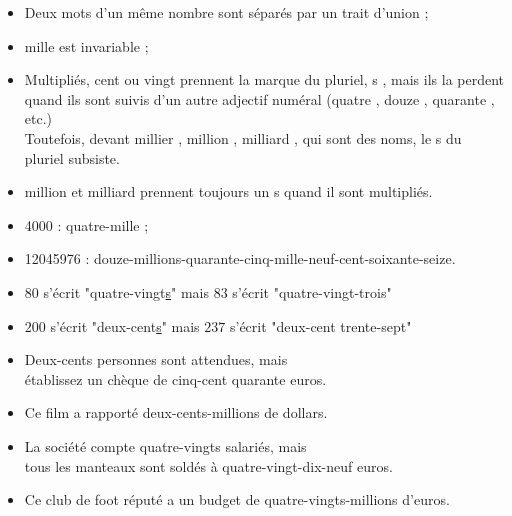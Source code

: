 \begin{propriete}   
   \begin{itemize}
      \item Deux mots d'un même nombre sont séparés par un trait d'union ;
      \item \og mille \fg est invariable ;
      \item Multipliés, \og cent \fg ou \og vingt \fg prennent la marque du pluriel, \og s \fg, mais ils la perdent quand ils sont suivis d’un autre adjectif numéral (\og quatre \fg, \og douze \fg, \og quarante \fg, etc.)\\
      Toutefois, devant \og millier \fg, \og million \fg, \og milliard \fg, qui sont des noms, le \og s \fg du pluriel subsiste.
      \item \og million \fg et \og milliard \fg prennent toujours un \og s \fg{} quand il sont multipliés.
   \end{itemize}
\end{propriete}

\begin{exemple*1}
   \begin{itemize}
        \item \num{4000} : quatre-mille ;        
        \item \num{12045976} : douze-millions-quarante-cinq-mille-neuf-cent-soixante-seize.
        \item $80$ s'écrit "quatre-vingt\underline{s}" mais $83$ s'écrit "quatre-vingt-trois"
        \item $200$ s'écrit "deux-cent\underline{s}" mais $237$ s'écrit "deux-cent trente-sept"
        \item Deux-cents personnes sont attendues, mais \\
        établissez un chèque de cinq-cent quarante euros.
        \item Ce film a rapporté deux-cents-millions de dollars.
        \item La société compte quatre-vingts salariés, mais\\
        tous les manteaux sont soldés à quatre-vingt-dix-neuf euros.
        \item Ce club de foot réputé a un budget de quatre-vingts-millions d’euros.
    \end{itemize}
\end{exemple*1}